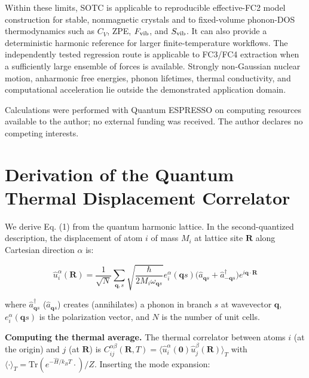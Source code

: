 \documentclass[aps,prb,reprint,amsmath,amssymb,floatfix]{revtex4-2}
\begin{document}
\color{revisionblue}
Within these limits, SOTC is applicable to reproducible effective-FC2 model
construction for stable, nonmagnetic crystals and to fixed-volume phonon-DOS
thermodynamics such as \(C_V\), ZPE, \(F_{\rm vib}\), and \(S_{\rm vib}\). It
can also provide a deterministic harmonic reference for larger
finite-temperature workflows. The independently tested regression route is
applicable to FC3/FC4 extraction when a sufficiently large ensemble of forces
is available. Strongly non-Gaussian nuclear motion, anharmonic free energies,
phonon lifetimes, thermal conductivity, and computational acceleration lie
outside the demonstrated application domain.
\color{black}

\color{revisionblue}
\begin{acknowledgments}
Calculations were performed with Quantum ESPRESSO on computing resources
available to the author; no external funding was received. The author declares
no competing interests.
\end{acknowledgments}
\color{black}

\appendix

\section{Derivation of the Quantum Thermal Displacement
Correlator}\label{appendix-a-derivation-of-the-quantum-thermal-displacement-correlator}

We derive Eq. (1) from the quantum harmonic lattice. In the
second-quantized description, the displacement of atom \(i\) of mass
\(M_i\) at lattice site \(\mathbf{R}\) along Cartesian direction
\(\alpha\) is:

\begin{equation*}
\hat{u}_i^\alpha(\mathbf{R}) = \frac{1}{\sqrt{N}}\sum_{\mathbf{q},s}\sqrt{\frac{\hbar}{2M_i\omega_{\mathbf{q}s}}} e_i^\alpha(\mathbf{q}s)\bigl(\hat{a}_{\mathbf{q}s} + \hat{a}_{-\mathbf{q}s}^\dagger\bigr)e^{i\mathbf{q}\cdot\mathbf{R}}
\end{equation*}

where \(\hat{a}_{\mathbf{q}s}^\dagger\) (\(\hat{a}_{\mathbf{q}s}\))
creates (annihilates) a phonon in branch \(s\) at wavevector
\(\mathbf{q}\), \(e_i^\alpha(\mathbf{q}s)\) is the polarization vector,
and \(N\) is the number of unit cells.

\textbf{Computing the thermal average.} The thermal correlator between
atoms \(i\) (at the origin) and \(j\) (at \(\mathbf{R}\)) is
\(C_{ij}^{\alpha\beta}(\mathbf{R},T) = \langle\hat{u}_i^\alpha(\mathbf{0})\hat{u}_j^\beta(\mathbf{R})\rangle_T\)
with \(\langle\cdot\rangle_T = \mathrm{Tr}(e^{-\hat{H}/k_BT}\cdot)/Z\).
Inserting the mode expansion:
\end{document}

